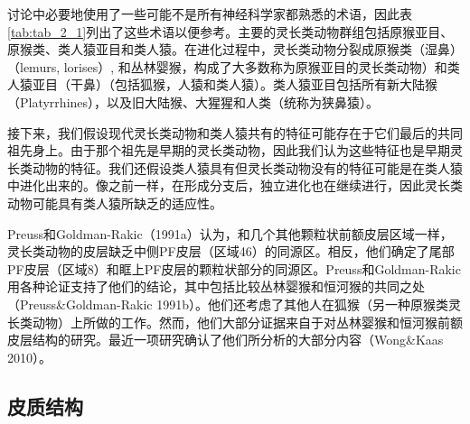 讨论中必要地使用了一些可能不是所有神经科学家都熟悉的术语，因此表\ref{tab:tab_2_1}列出了这些术语以便参考。主要的灵长类动物群组包括原猴亚目、原猴类、类人猿亚目和类人猿。在进化过程中，灵长类动物分裂成原猴类（湿鼻）（lemurs, lorises）, 和丛林婴猴，构成了大多数称为原猴亚目的灵长类动物）和类人猿亚目（干鼻）（包括狐猴，人猿和类人猿）。类人猿亚目包括所有新大陆猴（Platyrrhines），以及旧大陆猴、大猩猩和人类（统称为狭鼻猿）。

接下来，我们假设现代灵长类动物和类人猿共有的特征可能存在于它们最后的共同祖先身上。由于那个祖先是早期的灵长类动物，因此我们认为这些特征也是早期灵长类动物的特征。我们还假设类人猿具有但灵长类动物没有的特征可能是在类人猿中进化出来的。像之前一样，在形成分支后，独立进化也在继续进行，因此灵长类动物可能具有类人猿所缺乏的适应性。

Preuss和Goldman-Rakic（1991a）认为，和几个其他颗粒状前额皮层区域一样，灵长类动物的皮层缺乏中侧PF皮层（区域46）的同源区。相反，他们确定了尾部PF皮层（区域8）和眶上PF皮层的颗粒状部分的同源区。Preuss和Goldman-Rakic用各种论证支持了他们的结论，其中包括比较丛林婴猴和恒河猴的共同之处（Preuss\&Goldman-Rakic 1991b）。他们还考虑了其他人在狐猴（另一种原猴类灵长类动物）上所做的工作。然而，他们大部分证据来自于对丛林婴猴和恒河猴前额皮层结构的研究。最近一项研究确认了他们所分析的大部分内容（Wong\&Kaas 2010）。

\subsection{皮质结构}


